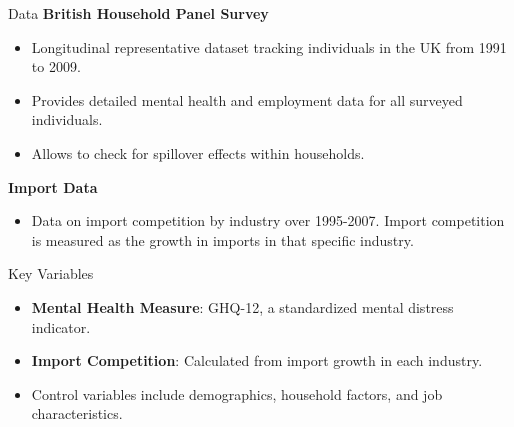 \documentclass{beamer}
\begin{document}
\begin{frame}{Data}
    \textbf{British Household Panel Survey}
    \begin{itemize}
        \item Longitudinal representative dataset tracking individuals in the UK from 1991 to 2009.
        \item Provides detailed mental health and employment data for all surveyed individuals.
        \item Allows to check for spillover effects within households.
        \end{itemize}
        \textbf{Import Data}
        \begin{itemize}
        \item Data on import competition by industry over 1995-2007. Import competition is measured as the growth in imports in that specific industry.
    \end{itemize}
\end{frame}

\begin{frame}{Key Variables}
    \begin{itemize}
        \item \textbf{Mental Health Measure}: GHQ-12, a standardized mental distress indicator.
        \item \textbf{Import Competition}: Calculated from import growth in each industry.
        \item Control variables include demographics, household factors, and job characteristics.
    \end{itemize}
\end{frame}
\end{document}
